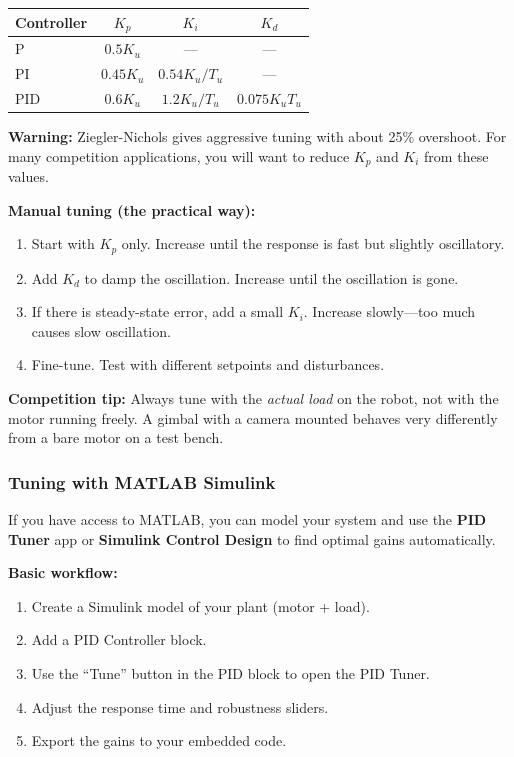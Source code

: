 \begin{center}
\begin{tabular}{lccc}
\toprule
\textbf{Controller} & $K_p$ & $K_i$ & $K_d$ \\
\midrule
P & $0.5 K_u$ & --- & --- \\
PI & $0.45 K_u$ & $0.54 K_u / T_u$ & --- \\
PID & $0.6 K_u$ & $1.2 K_u / T_u$ & $0.075 K_u T_u$ \\
\bottomrule
\end{tabular}
\end{center}

\textbf{Warning:} Ziegler-Nichols gives aggressive tuning with about 25\% overshoot. For many competition applications, you will want to reduce $K_p$ and $K_i$ from these values.

\textbf{Manual tuning (the practical way):}
\begin{enumerate}
    \item Start with $K_p$ only. Increase until the response is fast but slightly oscillatory.
    \item Add $K_d$ to damp the oscillation. Increase until the oscillation is gone.
    \item If there is steady-state error, add a small $K_i$. Increase slowly---too much causes slow oscillation.
    \item Fine-tune. Test with different setpoints and disturbances.
\end{enumerate}

\textbf{Competition tip:} Always tune with the \textit{actual load} on the robot, not with the motor running freely. A gimbal with a camera mounted behaves very differently from a bare motor on a test bench.

\subsubsection{Tuning with MATLAB Simulink}

If you have access to MATLAB, you can model your system and use the \textbf{PID Tuner} app or \textbf{Simulink Control Design} to find optimal gains automatically.

\textbf{Basic workflow:}
\begin{enumerate}
    \item Create a Simulink model of your plant (motor + load).
    \item Add a PID Controller block.
    \item Use the ``Tune'' button in the PID block to open the PID Tuner.
    \item Adjust the response time and robustness sliders.
    \item Export the gains to your embedded code.
\end{enumerate}

